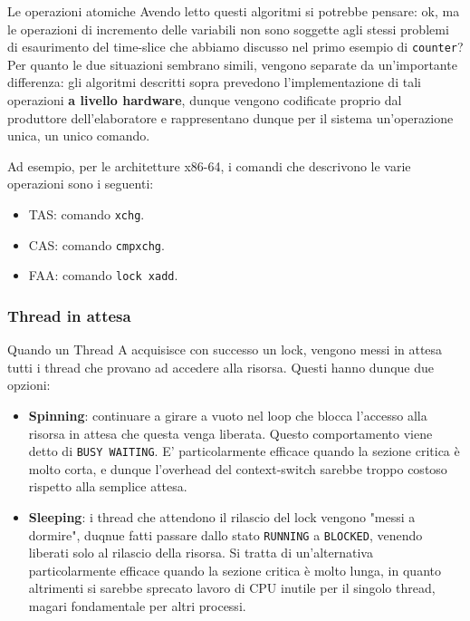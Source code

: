 \documentclass[12pt]{report}
\begin{document}
	\begin{osservazione}{Le operazioni atomiche}{}
		Avendo letto questi algoritmi si potrebbe pensare: ok, ma le operazioni di incremento delle variabili non sono soggette agli stessi problemi di esaurimento del time-slice che abbiamo discusso nel primo esempio di \texttt{counter}?\\
		Per quanto le due situazioni sembrano simili, vengono separate da un'importante differenza: gli algoritmi descritti sopra prevedono l'implementazione di tali operazioni \textbf{a livello hardware}, dunque vengono codificate proprio dal produttore dell'elaboratore e rappresentano dunque per il sistema un'operazione unica, un unico comando.
		\smallbreak
		
		Ad esempio, per le architetture x86-64, i comandi che descrivono le varie operazioni sono i seguenti:
		\begin{itemize}
			\item TAS: comando \texttt{xchg}.
			
			\item CAS: comando \texttt{cmpxchg}.
			
			\item FAA: comando \texttt{lock xadd}.
		\end{itemize}
	\end{osservazione}
	
	\subsubsection*{Thread in attesa}
	Quando un Thread A acquisisce con successo un lock, vengono messi in attesa tutti i thread che provano ad accedere alla risorsa. Questi hanno dunque due opzioni:
	\begin{itemize}
		\item \textbf{Spinning}: continuare a girare a vuoto nel loop che blocca l'accesso alla risorsa in attesa che questa venga liberata. Questo comportamento viene detto di \texttt{BUSY WAITING}. E' particolarmente efficace quando la sezione critica è molto corta, e dunque l'overhead del context-switch sarebbe troppo costoso rispetto alla semplice attesa.
		
		\item \textbf{Sleeping}: i thread che attendono il rilascio del lock vengono "messi a dormire", duqnue fatti passare dallo stato \texttt{RUNNING} a \texttt{BLOCKED}, venendo liberati solo al rilascio della risorsa. Si tratta di un'alternativa particolarmente efficace quando la sezione critica è molto lunga, in quanto altrimenti si sarebbe sprecato lavoro di CPU inutile per il singolo thread, magari fondamentale per altri processi.
	\end{itemize}
	
\end{document}
